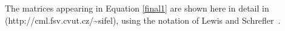 The matrices appearing in Equation \eqref{final1} are shown here in detail in~\cite{pesavento}\\
(\textsf {http://cml.fsv.cvut.cz/\~{}sifel}), using the notation of Lewis and Schrefler~\cite{lewis}.
